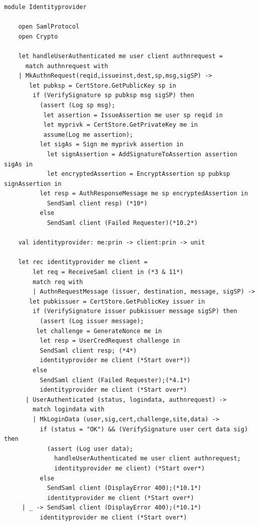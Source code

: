 \documentclass[twosided]{report}
\begin{document}
\begin{lstlisting}[style=fstar, caption={[NemID identity provider implementation]NemID identity provider implementation \cite{jacob}}, label={list:nemididp}]
	module Identityprovider

	open SamlProtocol
	open Crypto

	let handleUserAuthenticated me user client authnrequest =
	  match authnrequest with 
  	| MkAuthnRequest(reqid,issueinst,dest,sp,msg,sigSP) ->
   	   let pubksp = CertStore.GetPublicKey sp in
  	    if (VerifySignature sp pubksp msg sigSP) then
  	      (assert (Log sp msg);
 	       let assertion = IssueAssertion me user sp reqid in
 	       let myprivk = CertStore.GetPrivateKey me in
 	       assume(Log me assertion);
  	      let sigAs = Sign me myprivk assertion in
	        let signAssertion = AddSignatureToAssertion assertion sigAs in
	        let encryptedAssertion = EncryptAssertion sp pubksp 
signAssertion in
  	      let resp = AuthResponseMessage me sp encryptedAssertion in
	        SendSaml client resp) (*10*)
	      else
	        SendSaml client (Failed Requester)(*10.2*)

	val identityprovider: me:prin -> client:prin -> unit

	let rec identityprovider me client =
		let req = ReceiveSaml client in (*3 & 11*)
		match req with
		| AuthnRequestMessage (issuer, destination, message, sigSP) ->
 	   let pubkissuer = CertStore.GetPublicKey issuer in
	    if (VerifySignature issuer pubkissuer message sigSP) then
	      (assert (Log issuer message);
 	     let challenge = GenerateNonce me in
	      let resp = UserCredRequest challenge in
	      SendSaml client resp; (*4*)
	      identityprovider me client (*Start over*))
	    else
	      SendSaml client (Failed Requester);(*4.1*)
	      identityprovider me client (*Start over*)
	  | UserAuthenticated (status, logindata, authnrequest) ->
	    match logindata with 
	    | MkLoginData (user,sig,cert,challenge,site,data) ->
	      if (status = "OK") && (VerifySignature user cert data sig) then
	        (assert (Log user data);
	          handleUserAuthenticated me user client authnrequest;
	          identityprovider me client) (*Start over*)
	      else
	        SendSaml client (DisplayError 400);(*10.1*)
	        identityprovider me client (*Start over*)
 	 | _ -> SendSaml client (DisplayError 400);(*10.1*)
  	      identityprovider me client (*Start over*)
\end{lstlisting}
\end{document}

